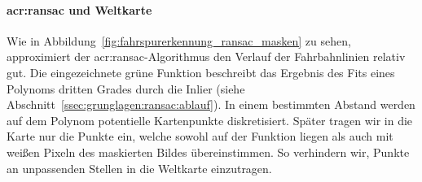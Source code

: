 
\paragraph{\gls{acr:ransac} und Weltkarte} 
Wie in Abbildung~\ref{fig:fahrspurerkennung_ransac_masken} zu sehen, approximiert der \gls{acr:ransac}-Algorithmus den Verlauf der Fahrbahnlinien relativ gut. Die eingezeichnete grüne Funktion beschreibt das Ergebnis des Fits eines Polynoms dritten Grades durch die Inlier (siehe Abschnitt~\ref{ssec:grunglagen:ransac:ablauf}). In einem bestimmten Abstand werden auf dem Polynom potentielle Kartenpunkte diskretisiert. Später tragen wir in die Karte nur die Punkte ein, welche sowohl auf der Funktion liegen als auch mit weißen Pixeln des maskierten Bildes übereinstimmen. So verhindern wir, Punkte an unpassenden Stellen in die Weltkarte einzutragen. 
